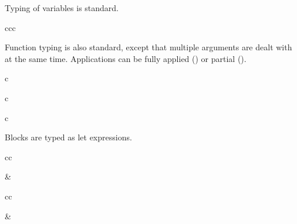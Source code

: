 \documentclass[11pt]{article}
\begin{document}
Typing of variables is standard.

\begin{rules}{ccc}


\end{rules}

Function typing is also standard, except that multiple arguments are dealt with at the same time.
Applications can be fully applied () or partial ().

\begin{rules}{c}


\end{rules}

\begin{rules}{c}

\end{rules}

\begin{rules}{c}


\end{rules}

Blocks are typed as let expressions.

\begin{rules}{cc}


&


\end{rules}

\begin{rules}{cc}


&


\end{rules}
\end{document}
